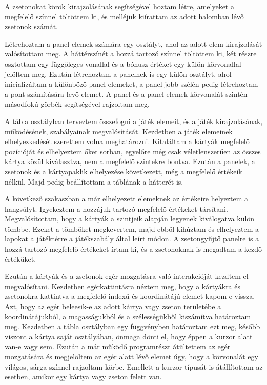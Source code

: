 
A zsetonokat körök kirajzolásának segítségével hoztam létre, amelyeket a megfelelő színnel töltöttem ki, és melléjük kiírattam az adott halomban lévő zsetonok számát.



Létrehoztam a panel elemek számára egy osztályt, ahol az adott elem kirajzolását valósítottam meg. A háttérszínét a hozzá tartozó színnel töltöttem ki, két részre osztottam egy függőleges vonallal és a bónusz értéket egy külön körvonallal jelöltem meg. Ezután létrehoztam a panelnek is egy külön osztályt, ahol inicializáltam a különböző panel elemeket, a panel jobb szélén pedig létrehoztam a pont számítására levő elemet. A panel és a panel elemek körvonalát szintén másodfokú görbék segítségével rajzoltam meg.


A tábla osztályban terveztem összefogni a játék elemeit, és a játék kirajzolásának, működésének, szabályainak megvalósítását. Kezdetben a játék elemeinek elhelyezkedését szerettem volna meghatározni. Kitaláltam a kártyák megfelelő pozícióját és elhelyeztem őket sorban, egyelőre még csak véletlenszerűen az összes kártya közül kiválasztva, nem a megfelelő szintekre bontva. Ezután a panelek, a zsetonok és a kártyapaklik elhelyezése következett, még a megfelelő értékeik nélkül. Majd pedig beállítottam a táblának a hátterét is.

A következő szakaszban a már elhelyezett elemeknek az értékeire helyeztem a hangsúlyt. Igyekeztem a hozzájuk tartozó megfelelő értékeket társítani. Megvalósítottam, hogy a kártyák a szintjeik alapján legyenek kiválogatva külön tömbbe. Ezeket a tömböket megkevertem, majd ebből kihúztam és elhelyeztem a lapokat a játéktérre a játékszabály által leírt módon. A zsetongyűjtő panelre is a hozzá tartozó megfelelő értékeket írtam ki, és a zsetonoknak is megadtam a kezdő értéküket.


Ezután a kártyák és a zsetonok egér mozgatásra való interakcióját kezdtem el megvalósítani. Kezdetben egérkattintásra néztem meg, hogy a kártyákra és zsetonokra kattintva a megfelelő indexű és koordinátájú elemet kapom-e vissza. Azt, hogy az egér beleesik-e az adott kártya vagy zseton területébe a koordinátájukból, a magasságukból és a szélességükből kiszámítva határoztam meg. Kezdetben a tábla osztályban egy függvényben határoztam ezt meg, később viszont a kártya saját osztályában, önmaga dönti el, hogy éppen a kurzor alatt van-e vagy sem. Ezután a már működő programrészt átültettem az egér mozgatására és megjelöltem az egér alatt lévő elemet úgy, hogy a körvonalát egy világos, sárga színnel rajzoltam körbe. Emellett a kurzor típusát is átállítottam az esetben, amikor egy kártya vagy zseton felett van.

